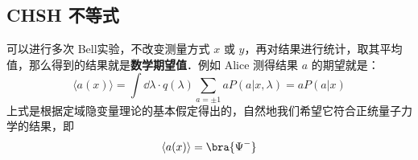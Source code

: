 \subsection{CHSH 不等式}
可以进行多次 Bell实验，不改变测量方式 $x$ 或 $y$，再对结果进行统计，取其平均值，那么得到的结果就是\textbf{数学期望值}．例如 Alice 测得结果 $a$ 的期望就是：
\begin{equation}
\langle a(x) \rangle =\int \dd \lambda \cdot q(\lambda) \sum_{a=\pm 1}a P(a|x,\lambda) = a P(a|x)
\end{equation}
上式是根据定域隐变量理论的基本假定得出的，自然地我们希望它符合正统量子力学的结果，即
\begin{equation}
\langle a(x)\rangle = \bra{\Psi^-}
\end{equation}

